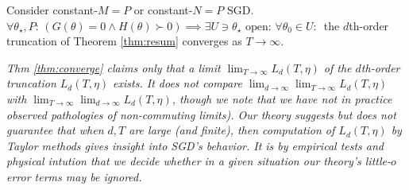 {            %
            \begin{thm} \label{thm:converge}
                Consider constant-$M=P$ or constant-$N=P$ SGD.
                $\forall \theta_\star,P:\, (G(\theta)=0 \wedge H(\theta)\succ
                0) \implies \exists U\ni \theta_\star\,\,\text{open}:\, \forall
                \theta_0\in U:\,$
                the $d$th-order truncation of Theorem \ref{thm:resum} converges
                as $T\to \infty$.
            \end{thm}
            \begin{rmk}
                \emph{
                Thm \ref{thm:converge} claims only that a limit
                $\lim_{T\to\infty} L_d(T,\eta)$ of the
                $d$th-order truncation $L_d(T,\eta)$ exists.
                It does not compare $\lim_{d\to\infty}
                \lim_{T\to\infty} L_d(T,\eta)$ with $\lim_{T\to\infty}
                \lim_{d\to\infty} L_d(T,\eta)$, though we note that we have not in practice
                observed pathologies of non-commuting limits).
                Our theory suggests but does not guarantee that when $d, T$ are
                large (and finite), then computation of $L_d(T,\eta)$ by Taylor
                methods gives insight into SGD's behavior.  It is by empirical
                tests and physical intution that we decide whether in a given
                situation our theory's little-$o$ error terms may be ignored. 
                }
            \end{rmk}

}
